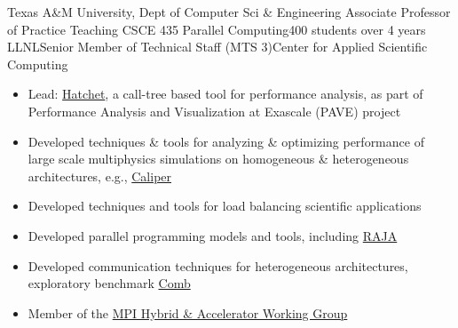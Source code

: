 		{Texas A\&M University, Dept of Computer Sci \& Engineering}
		{Associate Professor of Practice}
		{Teaching CSCE 435 Parallel Computing}{400 students over 4 years}{}
	{LLNL}{Senior Member of Technical Staff (MTS 3)}{Center for Applied Scientific Computing}{}
		{\begin{itemize}
		      \item Lead: \href{https://llnl-hatchet.readthedocs.io/en/latest/}{Hatchet}, a call-tree based tool for performance analysis,
		      	as part of Performance Analysis and Visualization at Exascale (PAVE) project %
		\item Developed techniques \& tools for analyzing \& optimizing performance 
			of large scale multiphysics simulations %
			on homogeneous \& heterogeneous architectures, 
			e.g., \href{https://software.llnl.gov/Caliper/index.html}{Caliper} %
		\item Developed techniques and tools for load balancing scientific applications %
		\item Developed parallel programming models and tools, including \href{https://raja.readthedocs.io/en/main/}{RAJA} %
		\item Developed communication techniques for heterogeneous architectures, %
			exploratory benchmark \href{https://github.com/LLNL/Comb}{Comb} %
          	\item Member of the \href{https://github.com/mpiwg-hybrid/hybrid-issues}{MPI Hybrid \& Accelerator Working Group}
		\end{itemize}}